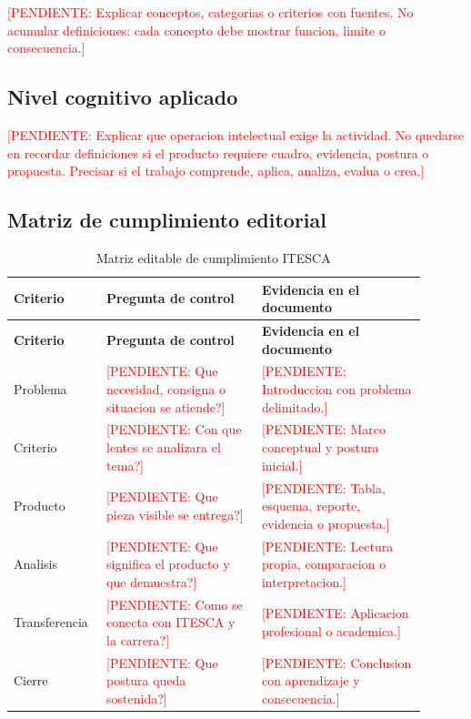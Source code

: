\documentclass[
	spanish,
	letterpaper, oneside
]{article}
\newcommand{\pendiente}[1]{\textcolor{red}{[PENDIENTE: #1]}}
\begin{document}
\pendiente{Explicar conceptos, categorias o criterios con fuentes. No acumular definiciones: cada concepto debe mostrar funcion, limite o consecuencia.}

\subsection{Nivel cognitivo aplicado}

\pendiente{Explicar que operacion intelectual exige la actividad. No quedarse en recordar definiciones si el producto requiere cuadro, evidencia, postura o propuesta. Precisar si el trabajo comprende, aplica, analiza, evalua o crea.}

\subsection{Matriz de cumplimiento editorial}

\begin{longtable}{@{}p{0.18\linewidth}p{0.35\linewidth}p{0.37\linewidth}@{}}
	\caption{Matriz editable de cumplimiento ITESCA}\label{tab:matriz-cumplimiento-itesca}\\
	\toprule
	\textbf{Criterio} & \textbf{Pregunta de control} & \textbf{Evidencia en el documento} \\
	\midrule
	\endfirsthead
	\toprule
	\textbf{Criterio} & \textbf{Pregunta de control} & \textbf{Evidencia en el documento} \\
	\midrule
	\endhead
	Problema & \pendiente{Que necesidad, consigna o situacion se atiende?} & \pendiente{Introduccion con problema delimitado.} \\
	Criterio & \pendiente{Con que lentes se analizara el tema?} & \pendiente{Marco conceptual y postura inicial.} \\
	Producto & \pendiente{Que pieza visible se entrega?} & \pendiente{Tabla, esquema, reporte, evidencia o propuesta.} \\
	Analisis & \pendiente{Que significa el producto y que demuestra?} & \pendiente{Lectura propia, comparacion o interpretacion.} \\
	Transferencia & \pendiente{Como se conecta con ITESCA y la carrera?} & \pendiente{Aplicacion profesional o academica.} \\
	Cierre & \pendiente{Que postura queda sostenida?} & \pendiente{Conclusion con aprendizaje y consecuencia.} \\
	\bottomrule
\end{longtable}
\end{document}
